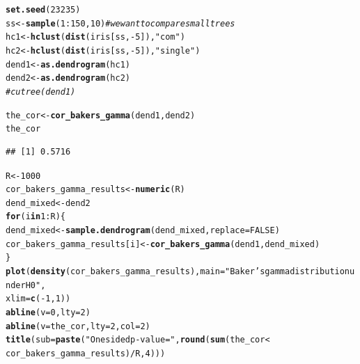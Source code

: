 \documentclass[shortnames,nojss,article]{jss}\usepackage[]{graphicx}\usepackage[]{color}
\makeatletter
\newcommand{\hlnum}[1]{\textcolor[rgb]{0.686,0.059,0.569}{#1}}%
\newcommand{\hlstr}[1]{\textcolor[rgb]{0.192,0.494,0.8}{#1}}%
\newcommand{\hlcom}[1]{\textcolor[rgb]{0.678,0.584,0.686}{\textit{#1}}}%
\newcommand{\hlopt}[1]{\textcolor[rgb]{0,0,0}{#1}}%
\newcommand{\hlstd}[1]{\textcolor[rgb]{0.345,0.345,0.345}{#1}}%
\newcommand{\hlkwa}[1]{\textcolor[rgb]{0.161,0.373,0.58}{\textbf{#1}}}%
\newcommand{\hlkwb}[1]{\textcolor[rgb]{0.69,0.353,0.396}{#1}}%
\newcommand{\hlkwc}[1]{\textcolor[rgb]{0.333,0.667,0.333}{#1}}%
\newcommand{\hlkwd}[1]{\textcolor[rgb]{0.737,0.353,0.396}{\textbf{#1}}}%
\newenvironment{kframe}{%
 \def\at@end@of@kframe{}%
 \ifinner\ifhmode%
  \def\at@end@of@kframe{\end{minipage}}%
  \begin{minipage}{\columnwidth}%
 \fi\fi%
 \def\FrameCommand##1{\hskip\@totalleftmargin \hskip-\fboxsep
 \colorbox{shadecolor}{##1}\hskip-\fboxsep
     \hskip-\linewidth \hskip-\@totalleftmargin \hskip\columnwidth}%
 \MakeFramed {\advance\hsize-\width
   \@totalleftmargin\z@ \linewidth\hsize
   \@setminipage}}%
 {\par\unskip\endMakeFramed%
 \at@end@of@kframe}
\newenvironment{knitrout}{}{} %
\makeatother
\begin{document}
\begin{knitrout}
\color{fgcolor}\begin{kframe}
\begin{alltt}
\hlkwd{set.seed}\hlstd{(}\hlnum{23235}\hlstd{)}
\hlstd{ss} \hlkwb{<-} \hlkwd{sample}\hlstd{(}\hlnum{1}\hlopt{:}\hlnum{150}\hlstd{,} \hlnum{10}\hlstd{)}  \hlcom{# we want to compare small trees}
\hlstd{hc1} \hlkwb{<-} \hlkwd{hclust}\hlstd{(}\hlkwd{dist}\hlstd{(iris[ss,} \hlopt{-}\hlnum{5}\hlstd{]),} \hlstr{"com"}\hlstd{)}
\hlstd{hc2} \hlkwb{<-} \hlkwd{hclust}\hlstd{(}\hlkwd{dist}\hlstd{(iris[ss,} \hlopt{-}\hlnum{5}\hlstd{]),} \hlstr{"single"}\hlstd{)}
\hlstd{dend1} \hlkwb{<-} \hlkwd{as.dendrogram}\hlstd{(hc1)}
\hlstd{dend2} \hlkwb{<-} \hlkwd{as.dendrogram}\hlstd{(hc2)}
\hlcom{# cutree(dend1)}

\hlstd{the_cor} \hlkwb{<-} \hlkwd{cor_bakers_gamma}\hlstd{(dend1, dend2)}
\hlstd{the_cor}
\end{alltt}
\begin{verbatim}
## [1] 0.5716
\end{verbatim}
\begin{alltt}
\hlstd{R} \hlkwb{<-} \hlnum{1000}
\hlstd{cor_bakers_gamma_results} \hlkwb{<-} \hlkwd{numeric}\hlstd{(R)}
\hlstd{dend_mixed} \hlkwb{<-} \hlstd{dend2}
\hlkwa{for} \hlstd{(i} \hlkwa{in} \hlnum{1}\hlopt{:}\hlstd{R) \{}
    \hlstd{dend_mixed} \hlkwb{<-} \hlkwd{sample.dendrogram}\hlstd{(dend_mixed,} \hlkwc{replace} \hlstd{=} \hlnum{FALSE}\hlstd{)}
    \hlstd{cor_bakers_gamma_results[i]} \hlkwb{<-} \hlkwd{cor_bakers_gamma}\hlstd{(dend1, dend_mixed)}
\hlstd{\}}
\hlkwd{plot}\hlstd{(}\hlkwd{density}\hlstd{(cor_bakers_gamma_results),} \hlkwc{main} \hlstd{=} \hlstr{"Baker's gamma distribution under H0"}\hlstd{,}
    \hlkwc{xlim} \hlstd{=} \hlkwd{c}\hlstd{(}\hlopt{-}\hlnum{1}\hlstd{,} \hlnum{1}\hlstd{))}
\hlkwd{abline}\hlstd{(}\hlkwc{v} \hlstd{=} \hlnum{0}\hlstd{,} \hlkwc{lty} \hlstd{=} \hlnum{2}\hlstd{)}
\hlkwd{abline}\hlstd{(}\hlkwc{v} \hlstd{= the_cor,} \hlkwc{lty} \hlstd{=} \hlnum{2}\hlstd{,} \hlkwc{col} \hlstd{=} \hlnum{2}\hlstd{)}
\hlkwd{title}\hlstd{(}\hlkwc{sub} \hlstd{=} \hlkwd{paste}\hlstd{(}\hlstr{"One sided p-value ="}\hlstd{,} \hlkwd{round}\hlstd{(}\hlkwd{sum}\hlstd{(the_cor} \hlopt{<}
    \hlstd{cor_bakers_gamma_results)}\hlopt{/}\hlstd{R,} \hlnum{4}\hlstd{)))}
\end{alltt}
\end{kframe}


\end{knitrout}
\end{document}
